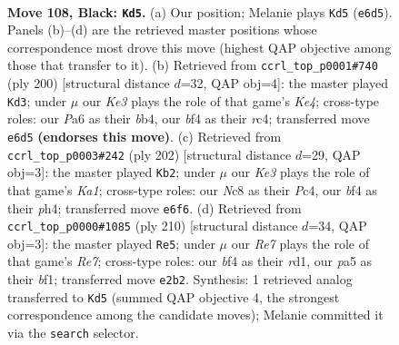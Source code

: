 \documentclass[11pt]{article}
\begin{document}
\clearpage

\begin{figure}[p]\centering
\begin{subfigure}{0.46\textwidth}\centering
\resizebox{\linewidth}{!}{%
\newchessgame
\chessboard[
  setfen={2n3K1/8/p3k3/P4p1p/5B2/N5P1/4r1b1/R7 b - - 27 108},
  showmover=false,
  pgfstyle=straightmove, color=movearrow, markmove={e6-d5}
]}
\caption{}
\end{subfigure}\hfill
\begin{subfigure}{0.46\textwidth}\centering
\resizebox{\linewidth}{!}{%
\newchessgame
\chessboard[
  setfen={6k1/5p2/5P2/p4NP1/Pbr1K2R/8/8/8 w - - 22 101},
  showmover=false,
  pgfstyle=straightmove, color=movearrow, markmove={e4-d3}
]}
\caption{}
\end{subfigure}
\\[4pt]
\begin{subfigure}{0.46\textwidth}\centering
\resizebox{\linewidth}{!}{%
\newchessgame
\chessboard[
  setfen={7k/r2b4/8/2pNP1b1/2P4p/2P5/2B5/K5R1 w - - 13 102},
  showmover=false,
  pgfstyle=straightmove, color=movearrow, markmove={a1-b2}
]}
\caption{}
\end{subfigure}\hfill
\begin{subfigure}{0.46\textwidth}\centering
\resizebox{\linewidth}{!}{%
\newchessgame
\chessboard[
  setfen={5k2/1BK1R3/p5p1/P5P1/8/8/8/3r1b2 w - - 66 106},
  showmover=false,
  pgfstyle=straightmove, color=movearrow, markmove={e7-e5}
]}
\caption{}
\end{subfigure}
\caption{\textbf{Move 108, Black: \texttt{Kd5}.} (a) Our position; Melanie plays \texttt{Kd5} (\texttt{e6d5}). Panels (b)--(d) are the retrieved master positions whose correspondence most drove this move (highest QAP objective among those that transfer to it). (b) Retrieved from \texttt{ccrl\_top\_p0001\#740} (ply 200) [structural distance $d$=32, QAP obj=4]: the master played \texttt{Kd3}; under $\mu$ our \emph{Ke3} plays the role of that game's \emph{Ke4}; cross-type roles: our \emph{P}a6 as their \emph{b}b4, our \emph{b}f4 as their \emph{r}c4; transferred move \texttt{e6d5} \textbf{(endorses this move)}. (c) Retrieved from \texttt{ccrl\_top\_p0003\#242} (ply 202) [structural distance $d$=29, QAP obj=3]: the master played \texttt{Kb2}; under $\mu$ our \emph{Ke3} plays the role of that game's \emph{Ka1}; cross-type roles: our \emph{N}c8 as their \emph{P}c4, our \emph{b}f4 as their \emph{p}h4; transferred move \texttt{e6f6}. (d) Retrieved from \texttt{ccrl\_top\_p0000\#1085} (ply 210) [structural distance $d$=34, QAP obj=3]: the master played \texttt{Re5}; under $\mu$ our \emph{Re7} plays the role of that game's \emph{Re7}; cross-type roles: our \emph{b}f4 as their \emph{r}d1, our \emph{p}a5 as their \emph{b}f1; transferred move \texttt{e2b2}. Synthesis: 1 retrieved analog transferred to \texttt{Kd5} (summed QAP objective 4, the strongest correspondence among the candidate moves); Melanie committed it via the \texttt{search} selector.}
\label{fig:thought-m215}
\end{figure}
\end{document}
